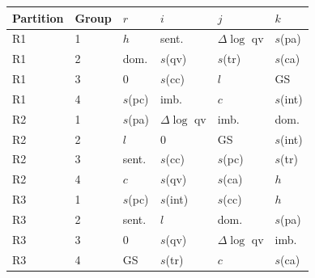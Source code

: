 \begin{tabular}{llllll}
\toprule
Partition & Group & $r$ & $i$ & $j$ & $k$ \\
\midrule
R1 & 1 & $h$ & sent. & $\Delta\log$ qv & $s$(pa) \\
R1 & 2 & dom. & $s$(qv) & $s$(tr) & $s$(ca) \\
R1 & 3 & $0$ & $s$(cc) & $l$ & GS \\
R1 & 4 & $s$(pc) & imb. & $c$ & $s$(int) \\
\midrule
R2 & 1 & $s$(pa) & $\Delta\log$ qv & imb. & dom. \\
R2 & 2 & $l$ & $0$ & GS & $s$(int) \\
R2 & 3 & sent. & $s$(cc) & $s$(pc) & $s$(tr) \\
R2 & 4 & $c$ & $s$(qv) & $s$(ca) & $h$ \\
\midrule
R3 & 1 & $s$(pc) & $s$(int) & $s$(cc) & $h$ \\
R3 & 2 & sent. & $l$ & dom. & $s$(pa) \\
R3 & 3 & $0$ & $s$(qv) & $\Delta\log$ qv & imb. \\
R3 & 4 & GS & $s$(tr) & $c$ & $s$(ca) \\
\bottomrule
\end{tabular}
